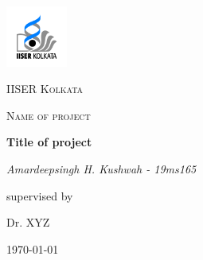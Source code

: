 \documentclass[12pt,a4paper]{report}
\begin{document}
    \begin{titlepage}

        \centering
        \includegraphics[width=0.15\textwidth]{images/logo.png}\par\vspace{1cm}
        {\scshape\LARGE IISER Kolkata \par}
        \vspace{1cm}
        {\scshape\Large Name of project \par}
        \vspace{1.5cm}
        {\huge\bfseries Title of project \par}
        \vspace{2cm}
        {\Large\itshape Amardeepsingh H. Kushwah - 19ms165 \par}
        \vfill
            supervised by\par
            Dr. XYZ \par
        \vfill

        {\large \today\par}

    \end{titlepage}

    \tableofcontents
    \newpage

    \begin{abstract}
        \vspace{1cm}
        \textbf{Abstract}
        \vspace{1cm}
        \textit{Abstract of the project -}
    \end{abstract}
\end{document}
